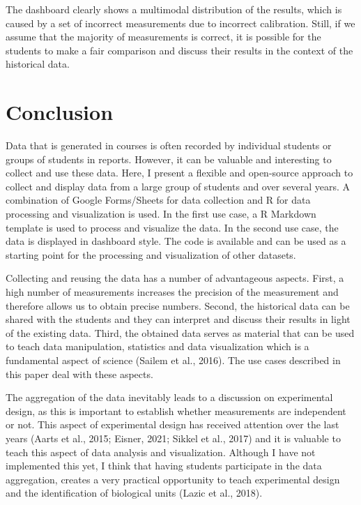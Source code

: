 \documentclass[
]{agujournal2019}
\begin{document}
The dashboard clearly shows a multimodal distribution of the results,
which is caused by a set of incorrect measurements due to incorrect
calibration. Still, if we assume that the majority of measurements is
correct, it is possible for the students to make a fair comparison and
discuss their results in the context of the historical data.

\hypertarget{sec-conclusion}{%
\section*{Conclusion}\label{sec-conclusion}}

Data that is generated in courses is often recorded by individual
students or groups of students in reports. However, it can be valuable
and interesting to collect and use these data. Here, I present a
flexible and open-source approach to collect and display data from a
large group of students and over several years. A combination of Google
Forms/Sheets for data collection and R for data processing and
visualization is used. In the first use case, a R Markdown template is
used to process and visualize the data. In the second use case, the data
is displayed in dashboard style. The code is available and can be used
as a starting point for the processing and visualization of other
datasets.

Collecting and reusing the data has a number of advantageous aspects.
First, a high number of measurements increases the precision of the
measurement and therefore allows us to obtain precise numbers. Second,
the historical data can be shared with the students and they can
interpret and discuss their results in light of the existing data.
Third, the obtained data serves as material that can be used to teach
data manipulation, statistics and data visualization which is a
fundamental aspect of science (Sailem et al., 2016). The use cases
described in this paper deal with these aspects.

The aggregation of the data inevitably leads to a discussion on
experimental design, as this is important to establish whether
measurements are independent or not. This aspect of experimental design
has received attention over the last years (Aarts et al., 2015; Eisner,
2021; Sikkel et al., 2017) and it is valuable to teach this aspect of
data analysis and visualization. Although I have not implemented this
yet, I think that having students participate in the data aggregation,
creates a very practical opportunity to teach experimental design and
the identification of biological units (Lazic et al., 2018).
\end{document}
